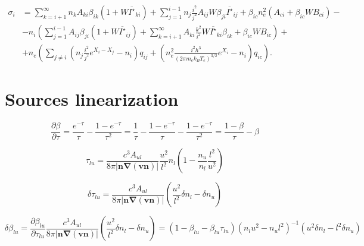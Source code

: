 \documentclass{article}
\begin{document}
\begin{equation}
    \begin{aligned}
        \sigma_i &= \sum\limits_{k=i+1}^\infty n_kA_{ki}\beta_{ik}(1 + W\overline{I^\star}_{ki}) + \sum\limits_{j=1}^{i-1} n_j\frac{i^2}{j^2}A_{ij}W\beta_{ji} \overline{I^\star}_{ij} +\beta_{ic}n_e^2(A_{ci} + \beta_{ic}WB_{ci}) -\\
        &-n_i\left(\sum\limits_{j=1}^{i-1}A_{ij}\beta_{ji}(1 + W\overline{I^\star}_{ij}) + \sum\limits_{k=i+1}^\infty A_{ki}\frac{k^2}{i^2}W\overline{I^\star}_{ki}\beta_{ik}  + \beta_{ic}WB_{ic}\right) +\\
        &+n_e\left(\sum\limits_{j \neq i}\left(n_j\frac{i^2}{j^2}e^{X_i-X_j}-n_i\right)q_{ij}  + \left(n_e^2\frac{i^2h^3}{(2\pi m_ek_BT_e)^{3/2}}e^{X_i}-n_i\right)q_{ic}\right). 
    \end{aligned}
\end{equation}

\section{Sources linearization}

\[
\frac{\partial \beta}{\partial \tau} = \frac{e^{-\tau}}{\tau} - \frac{1-e^{-\tau}}{\tau^2} = \frac{1}{\tau} - \frac{1 - e^{-\tau}}{\tau}  - \frac{1 - e^{-\tau}}{\tau^2} = \frac{1-\beta}{\tau} - \beta
\]

\[
    \tau_{lu} = \frac{c^3A_{ul}}{8\pi |\mathbf{n}\mathbf{\nabla}(\mathbf{v}\mathbf{n})|}\frac{u^2}{l^2} n_l \left(1 - \frac{n_u}{n_l}\frac{l^2}{u^2}\right)
\]

\[
    \delta\tau_{lu} =  \frac{c^3A_{ul}}{8\pi |\mathbf{n}\mathbf{\nabla}(\mathbf{v}\mathbf{n})|}\left( \frac{u^2}{l^2}\delta n_l - \delta n_u \right)
\]

\[
    \delta\beta_{lu} = \frac{\partial \beta_{lu}}{\partial \tau_{lu}} \frac{c^3A_{ul}}{8\pi |\mathbf{n}\mathbf{\nabla}(\mathbf{v}\mathbf{n})|}\left( \frac{u^2}{l^2}\delta n_l - \delta n_u \right) = (1 - \beta_{lu} - \beta_{lu}\tau_{lu})(n_lu^2 - n_ul^2)^{-1}(u^2\delta n_l - l^2 \delta n_u)
\]
\end{document}
